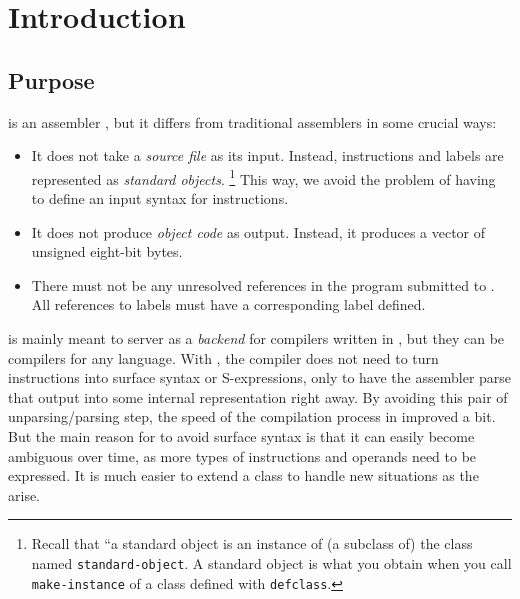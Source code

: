 \chapter{Introduction}
%

\section{Purpose}

\sysname{} is an assembler \cite{Salomon:1992:AL:152201}, but it
differs from traditional assemblers in some crucial ways:

\begin{itemize}
\item It does not take a \emph{source file} as its input.  Instead,
  instructions and labels are represented as \emph{standard
    objects}.%
\footnote{Recall that ``a standard object is an instance of (a
  subclass of) the class named \texttt{standard-object}.  A standard
  object is what you obtain when you call \texttt{make-instance} of
  a class defined with \texttt{defclass}.}  This way, we avoid the
problem of having to define an input syntax for instructions.
\item It does not produce \emph{object code} as output.  Instead, it
  produces a \commonlisp{} vector of unsigned eight-bit bytes.
\item There must not be any unresolved references in the program
  submitted to \sysname{}.  All references to labels must have a
  corresponding label defined.
\end{itemize}

\sysname{} is mainly meant to server as a \emph{backend} for
compilers written in \commonlisp{}, but they can be compilers for any
language.  With \sysname{}, the compiler does not need to turn
instructions into surface syntax or S-expressions, only to have the
assembler parse that output into some internal representation right
away.  By avoiding this pair of unparsing/parsing step, the
speed of the compilation process in improved a bit.  But the main
reason for \sysname{} to avoid surface syntax is that it can easily
become ambiguous over time, as more types of instructions and operands
need to be expressed.  It is much easier to extend a \clos{} class to
handle new situations as the arise.

